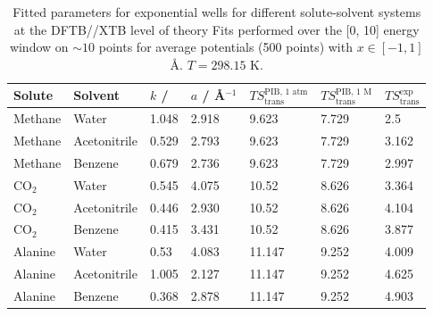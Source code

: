 \documentclass[../main.tex]{subfiles}
\begin{document}
\begin{table}[h!]
	\renewcommand{\arraystretch}{1.5}
	\begin{center}
		\small
		\begin{tabularx}{\textwidth}{YYYYYYY} 
			\toprule
			Solute & Solvent& $k$ / \kcal & $a$ / \AA$^{-1}$ & $TS_\text{trans}^\text{PIB, 1 atm}$ &  $TS_\text{trans}^\text{PIB, 1 M}$ & $TS_\text{trans}^\text{exp}$ \\
			\hline
			
			Methane  & Water & 1.048 & 2.918& 9.623  &  7.729  &  2.5 \\
			Methane  & Acetonitrile & 0.529 & 2.793 & 9.623  &  7.729  &  3.162\\
			Methane  & Benzene & 0.679& 2.736 &9.623  &  7.729  &  2.997\\
			CO$_2$  & Water&  0.545 & 4.075 &10.52  &  8.626  &  3.364\\
			CO$_2$  & Acetonitrile& 0.446& 2.930 &10.52  &  8.626  &  4.104\\
			CO$_2$  & Benzene & 0.415 &3.431 &10.52  &  8.626  &  3.877\\
			Alanine   &Water & 0.53 & 4.083 &11.147  &  9.252  &  4.009\\
			Alanine   & Acetonitrile&1.005 & 2.127 &11.147  &  9.252  &  4.625\\
			Alanine   & Benzene & 0.368 & 2.878 &11.147  &  9.252  &  4.903\\
			\bottomrule
		\end{tabularx}
	\end{center}
	\caption{Fitted parameters for exponential wells for different solute-solvent systems at the DFTB//XTB level of theory Fits performed over the [0, 10] \kcalx energy window on $\sim 10$ points for average potentials (500 points) with $x \in [-1, 1]$ \AA. $T = 298.15$ K.} 
	\label{table::figX9_params}
\end{table}
\end{document}
